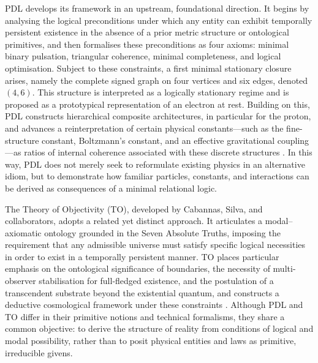\documentclass[11pt,a4paper]{article}
\begin{document}
PDL develops its framework in an upstream, foundational direction. It begins by analysing the logical preconditions under which any entity can exhibit temporally persistent existence in the absence of a prior metric structure or ontological primitives, and then formalises these preconditions as four axioms: minimal binary pulsation, triangular coherence, minimal completeness, and logical optimisation. Subject to these constraints, a first minimal stationary closure arises, namely the complete signed graph on four vertices and six edges, denoted \((4,6)\). This structure is interpreted as a logically stationary regime and is proposed as a prototypical representation of an electron at rest. Building on this, PDL constructs hierarchical composite architectures, in particular for the proton, and advances a reinterpretation of certain physical constants—such as the fine-structure constant, Boltzmann’s constant, and an effective gravitational coupling—as ratios of internal coherence associated with these discrete structures \cite{Laubscher_PDL_teaser,Laubscher_PDL_IMRad}. In this way, PDL does not merely seek to reformulate existing physics in an alternative idiom, but to demonstrate how familiar particles, constants, and interactions can be derived as consequences of a minimal relational logic.  

The Theory of Objectivity (TO), developed by Cabannas, Silva, and collaborators, adopts a related yet distinct approach. It articulates a modal–axiomatic ontology grounded in the Seven Absolute Truths, imposing the requirement that any admissible universe must satisfy specific logical necessities in order to exist in a temporally persistent manner. TO places particular emphasis on the ontological significance of boundaries, the necessity of multi-observer stabilisation for full-fledged existence, and the postulation of a transcendent substrate beyond the existential quantum, and constructs a deductive cosmological framework under these constraints \cite{Cabannas_Silva_TO_book,Cabannas_Silva_TO_neutrinos}. Although PDL and TO differ in their primitive notions and technical formalisms, they share a common objective: to derive the structure of reality from conditions of logical and modal possibility, rather than to posit physical entities and laws as primitive, irreducible givens.
\end{document}
